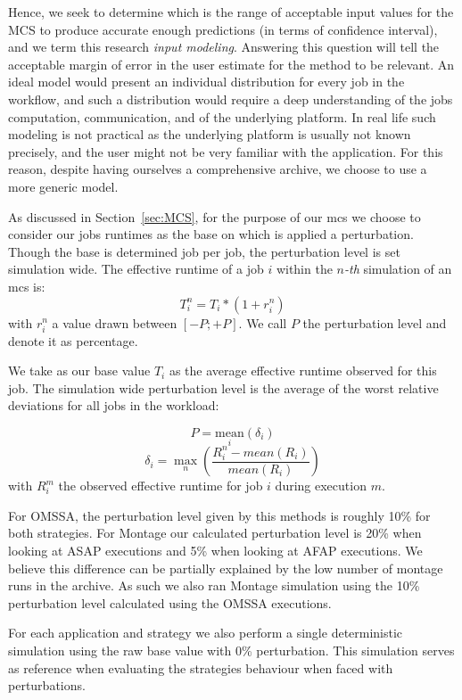 \documentclass[10pt,conference,compsocconf]{IEEEtran}
\begin{document}
Hence, we seek  to determine which is  the range of acceptable  input values for
the  \ac{MCS} to  produce accurate  enough predictions  (in terms  of confidence
interval),  and we  term this  research \emph{input  modeling}.  Answering  this
question will tell the  acceptable margin of error in the  user estimate for the
method to be relevant.
An ideal  model would present  an individual distribution  for every job  in the
workflow, and such a distribution would require a deep understanding of the jobs
computation, communication, and  of the underlying platform.  In  real life such
modeling  is not  practical  as the  underlying platform  is  usually not  known
precisely, and  the user might  not be very  familiar with the  application. For
this reason, despite having ourselves a  comprehensive archive, we choose to use
a more generic model.

As discussed in Section~\ref{sec:MCS}, for the purpose of our \ac{mcs} we choose
to  consider   our  jobs   runtimes  as   the  base  on   which  is   applied  a
perturbation. Though the base is determined  job per job, the perturbation level
is  set  simulation  wide.  The  effective  runtime of  a  job  $i$  within  the
$n$\textit{-th} simulation of an \ac{mcs} is:
\[T_i^n = T_i * (1+r_i^n)\]
with $r_i^n$ a value drawn between $[-P;+P]$. We call $P$ the perturbation level
and denote it as percentage. 

We take as  our base value $T_i$  as the average effective  runtime observed for
this job.  The simulation wide  perturbation level is  the average of  the worst
relative deviations for all jobs in the workload:

\[P = \underset{i}{\textrm{mean}}(\delta{}_i)\]
\[\delta{}_i = \max_n\left(\frac{R_i^n-mean(R_i)}{mean(R_i)}\right)\]
with $R_i^m$ the observed effective runtime for job $i$ during execution $m$. 

For OMSSA, the perturbation level given by this methods is roughly 10\% for both
strategies. For Montage  our calculated perturbation level is  20\% when looking
at ASAP  executions and  5\% when  looking at AFAP  executions. We  believe this
difference can be partially  explained by the low number of  montage runs in the
archive. As  such we  also ran  Montage simulation  using the  10\% perturbation
level calculated using the OMSSA executions.

For  each  application and  strategy  we  also  perform a  single  deterministic
simulation  using the  raw base  value  with 0\%  perturbation. This  simulation
serves as  reference when  evaluating the strategies  behaviour when  faced with
perturbations.
\end{document}
